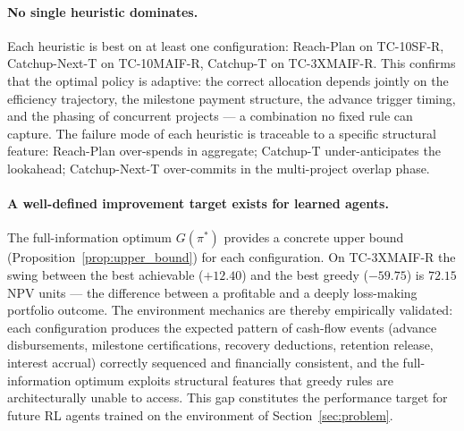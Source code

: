 \paragraph{No single heuristic dominates.}
Each heuristic is best on at least one configuration: Reach-Plan on
TC-10SF-R, Catchup-Next-T on TC-10MAIF-R, Catchup-T on TC-3XMAIF-R.
This confirms that the optimal policy is adaptive: the correct
allocation depends jointly on the efficiency trajectory, the milestone
payment structure, the advance trigger timing, and the phasing of
concurrent projects --- a combination no fixed rule can capture.
The failure mode of each heuristic is traceable to a specific
structural feature: Reach-Plan over-spends in aggregate; Catchup-T
under-anticipates the lookahead; Catchup-Next-T over-commits in the
multi-project overlap phase.

\paragraph{A well-defined improvement target exists for learned agents.}
The full-information optimum $G(\pi^*)$ provides a concrete upper
bound (Proposition~\ref{prop:upper_bound}) for each configuration.
On TC-3XMAIF-R the swing between the best achievable ($+12.40$) and
the best greedy ($-59.75$) is $72.15$ NPV units --- the difference
between a profitable and a deeply loss-making portfolio outcome. The
environment mechanics are thereby empirically validated: each
configuration produces the expected pattern of cash-flow events
(advance disbursements, milestone certifications, recovery deductions,
retention release, interest accrual) correctly sequenced and
financially consistent, and the full-information optimum exploits
structural features that greedy rules are architecturally unable to
access. This gap constitutes the performance target for future RL
agents trained on the environment of Section~\ref{sec:problem}.